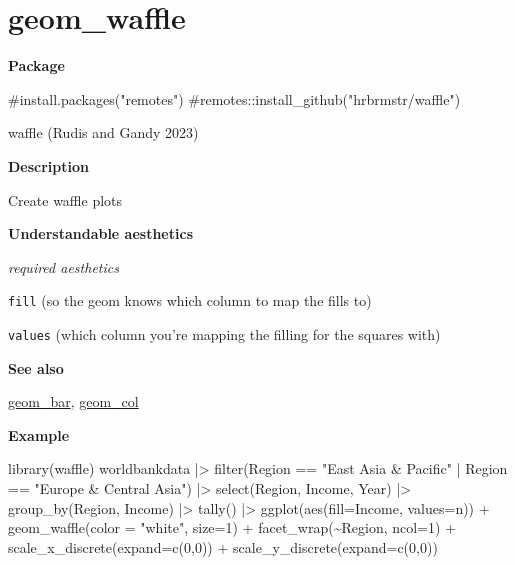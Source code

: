 \documentclass[
  letterpaper,
  DIV=11,
  numbers=noendperiod]{scrreprt}
\newenvironment{Shaded}{\begin{snugshade}}{\end{snugshade}}
\newcommand{\AttributeTok}[1]{\textcolor[rgb]{0.40,0.45,0.13}{#1}}
\newcommand{\CommentTok}[1]{\textcolor[rgb]{0.37,0.37,0.37}{#1}}
\newcommand{\DecValTok}[1]{\textcolor[rgb]{0.68,0.00,0.00}{#1}}
\newcommand{\FunctionTok}[1]{\textcolor[rgb]{0.28,0.35,0.67}{#1}}
\newcommand{\NormalTok}[1]{\textcolor[rgb]{0.00,0.23,0.31}{#1}}
\newcommand{\SpecialCharTok}[1]{\textcolor[rgb]{0.37,0.37,0.37}{#1}}
\newcommand{\StringTok}[1]{\textcolor[rgb]{0.13,0.47,0.30}{#1}}
\begin{document}
\section{geom\_waffle}\label{geom_waffle}

\textbf{Package}

\begin{Shaded}
\begin{Highlighting}[]
\CommentTok{\#install.packages("remotes")}
\CommentTok{\#remotes::install\_github("hrbrmstr/waffle")}
\end{Highlighting}
\end{Shaded}

waffle (Rudis and Gandy 2023)

\textbf{Description}

Create waffle plots

\textbf{Understandable aesthetics}

\emph{required aesthetics}

\texttt{fill} (so the geom knows which column to map the fills to)

\texttt{values} (which column you're mapping the filling for the squares
with)

\textbf{See also}

\hyperref[bar]{geom\_bar}, \hyperref[col]{geom\_col}

\textbf{Example}

\begin{Shaded}
\begin{Highlighting}[]
\FunctionTok{library}\NormalTok{(waffle)}
\NormalTok{worldbankdata }\SpecialCharTok{|\textgreater{}}
  \FunctionTok{filter}\NormalTok{(Region }\SpecialCharTok{==} \StringTok{"East Asia \& Pacific"} \SpecialCharTok{|}\NormalTok{ Region }\SpecialCharTok{==} \StringTok{"Europe \& Central Asia"}\NormalTok{) }\SpecialCharTok{|\textgreater{}}
  \FunctionTok{select}\NormalTok{(Region, Income, Year) }\SpecialCharTok{|\textgreater{}}
  \FunctionTok{group\_by}\NormalTok{(Region, Income) }\SpecialCharTok{|\textgreater{}}
  \FunctionTok{tally}\NormalTok{() }\SpecialCharTok{|\textgreater{}}
  \FunctionTok{ggplot}\NormalTok{(}\FunctionTok{aes}\NormalTok{(}\AttributeTok{fill=}\NormalTok{Income, }\AttributeTok{values=}\NormalTok{n)) }\SpecialCharTok{+}
  \FunctionTok{geom\_waffle}\NormalTok{(}\AttributeTok{color =} \StringTok{"white"}\NormalTok{, }\AttributeTok{size=}\DecValTok{1}\NormalTok{) }\SpecialCharTok{+}
  \FunctionTok{facet\_wrap}\NormalTok{(}\SpecialCharTok{\textasciitilde{}}\NormalTok{Region, }\AttributeTok{ncol=}\DecValTok{1}\NormalTok{) }\SpecialCharTok{+}
  \FunctionTok{scale\_x\_discrete}\NormalTok{(}\AttributeTok{expand=}\FunctionTok{c}\NormalTok{(}\DecValTok{0}\NormalTok{,}\DecValTok{0}\NormalTok{)) }\SpecialCharTok{+}
  \FunctionTok{scale\_y\_discrete}\NormalTok{(}\AttributeTok{expand=}\FunctionTok{c}\NormalTok{(}\DecValTok{0}\NormalTok{,}\DecValTok{0}\NormalTok{)) }
\end{Highlighting}
\end{Shaded}
\end{document}
